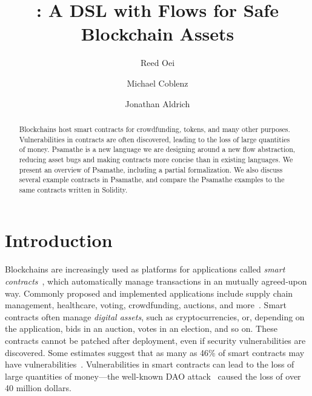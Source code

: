 \documentclass[nonacm, dvipsnames, sigconf]{acmart}
\begin{document}
\title{\langName: A DSL with Flows for Safe Blockchain Assets}

\author{Reed Oei}

\author{Michael Coblenz}

\author{Jonathan Aldrich}

\begin{abstract}
Blockchains host smart contracts for crowdfunding, tokens, and many other purposes.
Vulnerabilities in contracts are often discovered, leading to the loss of large quantities of money.
Psamathe is a new language we are designing around a new flow abstraction, reducing asset bugs and making contracts more concise than in existing languages.
We present an overview of Psamathe, including a partial formalization.
We also discuss several example contracts in Psamathe, and compare the Psamathe examples to the same contracts written in Solidity.
\end{abstract}

\maketitle

\section{Introduction}
Blockchains are increasingly used as platforms for applications called \emph{smart contracts}~\cite{Szabo97:Formalizing}, which automatically manage transactions in an mutually agreed-upon way.
Commonly proposed and implemented applications include supply chain management, healthcare, voting, crowdfunding, auctions, and more~\cite{SupplyChainUse,HealthcareUse,Elsden18:Making}.
Smart contracts often manage \emph{digital assets}, such as cryptocurrencies, or, depending on the application, bids in an auction, votes in an election, and so on.
These contracts cannot be patched after deployment, even if security vulnerabilities are discovered.
Some estimates suggest that as many as 46\% of smart contracts may have vulnerabilities~\cite{luuOyente}.
Vulnerabilities in smart contracts can lead to the loss of large quantities of money---the well-known DAO attack~\cite{DAO} caused the loss of over 40 million dollars.
\end{document}
